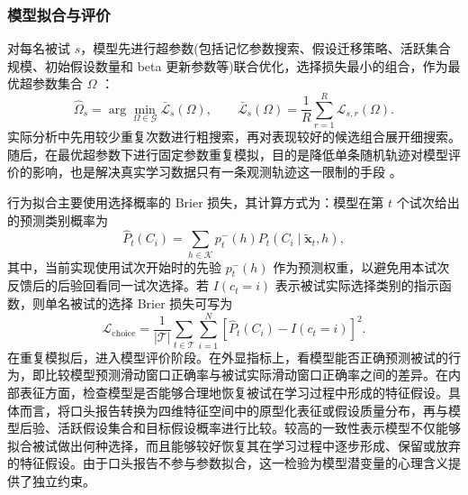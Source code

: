 \subsubsection{模型拟合与评价}

对每名被试 $s$，模型先进行超参数(包括记忆参数搜索、假设迁移策略、活跃集合规模、初始假设数量和 beta 更新参数等)联合优化，选择损失最小的组合，作为最优超参数集合 $\Omega$ ：
\begin{equation}
    \hat{\Omega}_s
    =
    \arg\min_{\Omega\in\mathcal G}
    \bar{\mathcal L}_s(\Omega),
    \qquad
    \bar{\mathcal L}_s(\Omega)
    =
    \frac{1}{R}\sum_{r=1}^{R}\mathcal L_{s,r}(\Omega).
    \label{eq:exp1-hyper-selection}
\end{equation}
实际分析中先用较少重复次数进行粗搜索，再对表现较好的候选组合展开细搜索。随后，在最优超参数下进行固定参数重复模拟，目的是降低单条随机轨迹对模型评价的影响，也是解决真实学习数据只有一条观测轨迹这一限制的手段 \parencite{gershman2015computational}。

行为拟合主要使用选择概率的 Brier 损失，其计算方式为：模型在第 $t$ 个试次给出的预测类别概率为
\begin{equation}
    \hat P_t(C_i)
    =
    \sum_{h\in\mathcal K}p_t^-(h)
    P_t(C_i\mid\tilde{\mathbf{x}}_t,h),
    \label{eq:exp1-pred-category-prob}
\end{equation}
其中，当前实现使用试次开始时的先验 $p_t^-(h)$ 作为预测权重，以避免用本试次反馈后的后验回看同一试次选择。若 $I(c_t=i)$ 表示被试实际选择类别的指示函数，则单名被试的选择 Brier 损失可写为
\begin{equation}
    \mathcal L_{\mathrm{choice}}
    =
    \frac{1}{|\mathcal T|}
    \sum_{t\in\mathcal T}
    \sum_{i=1}^{N}
    \left[\hat P_t(C_i)-I(c_t=i)\right]^2.
    \label{eq:exp1-choice-brier}
\end{equation}
在重复模拟后，进入模型评价阶段。在外显指标上，看模型能否正确预测被试的行为，即比较模型预测滑动窗口正确率与被试实际滑动窗口正确率之间的差异。在内部表征方面，检查模型是否能够合理地恢复被试在学习过程中形成的特征假设。具体而言，将口头报告转换为四维特征空间中的原型化表征或假设质量分布，再与模型后验、活跃假设集合和目标假设概率进行比较。较高的一致性表示模型不仅能够拟合被试做出何种选择，而且能够较好恢复其在学习过程中逐步形成、保留或放弃的特征假设。由于口头报告不参与参数拟合，这一检验为模型潜变量的心理含义提供了独立约束。